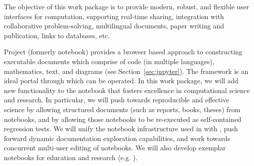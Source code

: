 \begin{draft}
\end{draft}

\begin{workpackage}[id=UI,wphases=0-48,
  title=User Interfaces,
  lead=SR,
  PSRM=12,  %
  UVRM=2,   %
  JURM=4,  %
  FAURM=8, %
  USHRM=6, %
  LLRM=12, %
  SARM=18, %
  UKRM=2, %
  UBRM=28,  %
  USORM=16, %
  SRRM=28,
  UGRM=14,
  USRM=4, %
  swsites]    %

\begin{wpobjectives}
  The objective of this work package is to provide modern, robust,
  and flexible user interfaces for computation, supporting real-time
  sharing, integration with collaborative problem-solving,
  multilingual documents, paper writing and publication, links to
  databases, etc.
\end{wpobjectives}

\begin{wpdescription}
  Project \Jupyter (formerly \IPython notebook) provides a browser
  based approach to constructing executable documents which comprise
  of code (in multiple languages), mathematics, text, and diagrams (see
  Section~\ref{sec:jupyter}). The
  framework is an ideal portal through which \VREs can be operated. In
  this work package, we will add new functionality to the \Jupyter
  notebook that fosters excellence in computational science and
  research. In particular, we will push towards reproducible and
  effective science by allowing structured documents (such as reports,
  books, theses) from notebooks, and by allowing those notebooks to be
  re-executed as self-contained regression tests. We will unify the
  notebook infrastructure used in \Sage with \Jupyter, push forward
  dynamic documentation exploration capabilities, and work towards
  concurrent multi-user editing of notebooks. We will also develop
  exemplar \Jupyter notebooks for education and research
  (e.g. ).


\end{wpdescription}
\end{workpackage}
